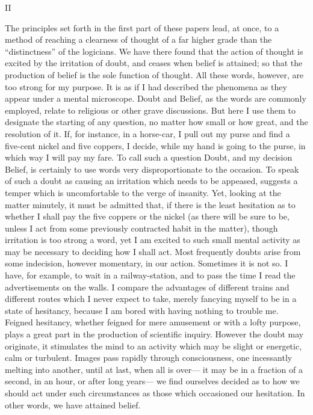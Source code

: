\documentclass[]{article}
\newcommand*{\itemsection}[1]{\bigskip\centerline{#1}\nopagebreak}
\begin{document}
\itemsection{II}

The principles set forth in the first part of these papers lead, at once, to a method of reaching a clearness of thought of a far higher grade than the ``distinctness'' of the logicians. We have there found that the action of thought is excited by the irritation of doubt, and ceases when belief is attained; so that the production of belief is the sole function of thought. All these words, however, are too strong for my purpose. It is as if I had described the phenomena as they appear under a mental microscope. Doubt and Belief, as the words are commonly employed, relate to religious or other grave discussions. But here I use them to designate the starting of any question, no matter how small or how great, and the resolution of it. If, for instance, in a horse-car, I pull out my purse and find a five-cent nickel and five coppers, I decide, while my hand is going to the purse, in which way I will pay my fare. To call such a question Doubt, and my decision Belief, is certainly to use words very disproportionate to the occasion. To speak of such a doubt as causing an irritation which needs to be appeased, suggests a temper which is uncomfortable to the verge of insanity. Yet, looking at the matter
minutely, it must be admitted that, if there is the least hesitation as to whether I shall pay the five coppers or the nickel (as there will be sure to be, unless I act  from some previously contracted habit in the matter), though irritation is too strong a word, yet I am excited to such small mental activity as may be necessary to deciding how I shall act. Most frequently doubts arise from some indecision, however momentary, in our action. Sometimes it is not so. I have, for example, to wait in a railway-station, and to pass the time I read the advertisements on the walls. I compare the advantages of different trains and different routes which I never expect to take, merely fancying myself to be in a state of hesitancy, because I am bored with having nothing to trouble me. Feigned hesitancy, whether feigned for mere amusement or with a lofty purpose, plays a great part in the production of scientific inquiry. However the doubt may originate, it stimulates the mind to an activity which may be slight or energetic, calm or turbulent. Images pass rapidly through consciousness, one incessantly melting into another, until at last, when all is over--- it may be in a fraction of a second, in an hour, or after long years--- we find ourselves decided as to how we should act under
such circumstances as those which occasioned our hesitation. In other words, we have attained belief.
 
\end{document}
